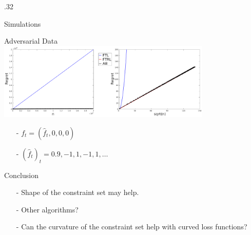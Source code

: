 \documentclass[final]{beamer} %
\newcommand{\hf}{\hat{f}}
\begin{document}
\begin{frame}[c]
\begin{columns}[t,totalwidth=\textwidth]
\begin{column} {.32\textwidth}
\begin{block}{Simulations}
\begin{minipage}{.9\linewidth}
\begin{block}{Adversarial Data}
					\centering
					\includegraphics[width=0.8\textwidth]{figures/ExpResults/WorstCase_alt_new}
					\smallskip
					\footnotesize
					\begin{itemize}
						\item[-] $f_t=(\hf_t,0,0,0)$
						\item[-] $(\hf_t)_t = 0.9, -1,1,-1,1,\ldots$
					\end{itemize}
					\vspace{-1cm}	
				\end{block}				
			\end{minipage}
		\end{block}
		
		\vspace{0.0ex}
		\begin{block}{Conclusion}	
			\vspace{-0.3cm}
			\begin{itemize}
				\item[-] Shape of the constraint set may help. \medskip
				\item[-] Other algorithms? \medskip
				\item[-] Can the curvature of the constraint set help with curved loss functions?
				\vspace{-0.3cm}
			\end{itemize}
		\end{block}
		\vspace{0.0ex}
	\end{column}
		
	\begin{column}{0.01\textwidth}
	\end{column}
\end{columns}

\medskip


\end{frame}
\end{document}
